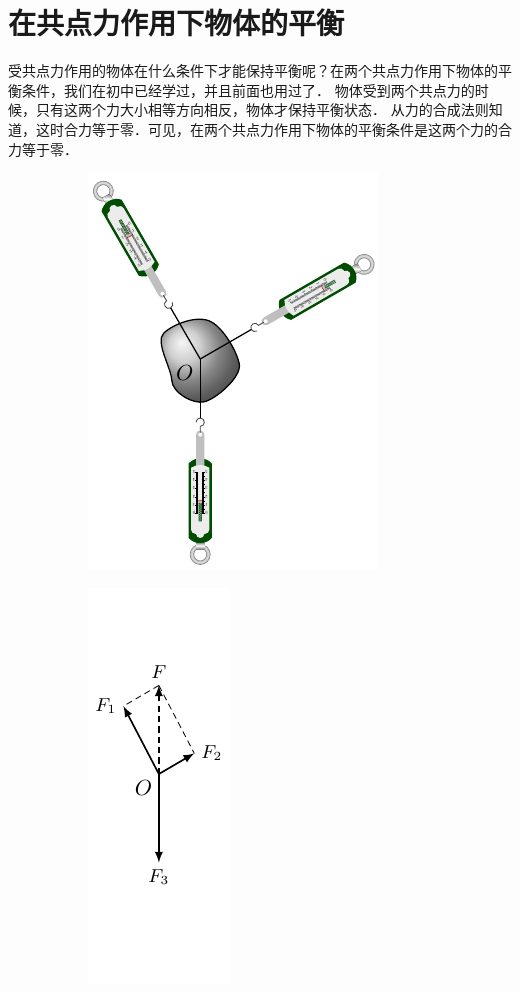 \section{在共点力作用下物体的平衡}
受共点力作用的物体在什么条件下才能保持平衡呢？在两个共点力作用下物体的平衡条件，我们在初中已经学过，并且前面也用过了．
物体受到两个共点力的时候，只有这两个力大小相等方向相反，物体才保持平衡状态．
从力的合成法则知道，这时合力等于零．可见，在两个共点力作用下物体的平衡条件是这两个力的合力等于零．
\begin{figure}[htbp]
    \centering
    \begin{subfigure} {0.4\linewidth} 
        \centering
        \includegraphics{fig/A/6-1a.pdf} 
        \caption{}\label{fig_A_6-1a} 
    \end{subfigure}
    \hfil
    \begin{subfigure} {0.4\linewidth} 
        \centering
        \includegraphics{fig/A/6-1b.pdf} 
        \caption{}\label{fig_A_6-1b} 
    \end{subfigure}
    \caption{}\label{fig_A_6-1}
\end{figure}


